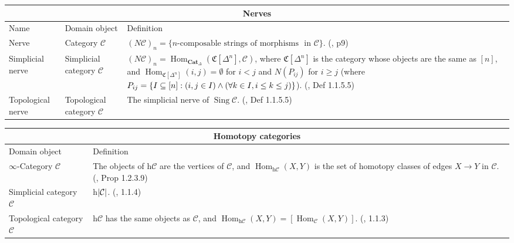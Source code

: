 \documentclass{article}
\DeclareMathOperator{\Hom}{Hom}
\DeclareMathOperator{\Sing}{Sing}
\def\subq{\ensuremath\subseteq}
\begin{document}
\begin{tabular}{ |p{3cm}||p{5cm}|p{7cm}|}
 \hline
 \multicolumn{3}{|c|}{Nerves}\\
 \hline
 Name& Domain object & Definition\\
  \hline\hline
  Nerve & Category \(\mathcal{C}\) & \((N\mathcal{C})_n=\text{\{}n\text{-composable strings of morphisms}\) \(\text{ in } \mathcal{C}\text{\}}\). (\autocite{htt}, p9) \\
 \hline
 Simplicial nerve & Simplicial category \(\mathcal{C}\) & \((N \mathcal{C})_n=\Hom_{\textbf{Cat}_\Delta}(\mathfrak{C}[\Delta^n], \mathcal{C})\), where \(\mathfrak{C}[\Delta^n]\) is the category whose objects are the same as \([n]\), and \(\Hom_{\mathfrak{C}[\Delta^n]}(i,j)=\emptyset\) for \(i<j\) and \(N(P_{ij})\) for \(i\geq j\) (where \(P_{ij}=\{I \subq [n] : (i, j \in I)\wedge (\forall k \in I, i \leq k \leq j)\}\)). (\autocite{htt}, Def 1.1.5.5)\\
 \hline
 Topological nerve & Topological category \(\mathcal{C}\) & The simplicial nerve of \(\Sing \mathcal{C}\). (\autocite{htt}, Def 1.1.5.5)\\
 \hline
\end{tabular}

\text{}

\text{}

\begin{tabular}{ |p{5cm}||p{8cm}|}
 \hline
 \multicolumn{2}{|c|}{Homotopy categories}\\
 \hline
 Domain object & Definition\\
  \hline\hline
  \(\infty\)-Category \(\mathcal{C}\) & The objects of h\(\mathcal{C}\) are the vertices of \(\mathcal{C}\), and \(\Hom_{\text{h}\mathcal{C}}(X,Y)\) is the set of homotopy classes of edges \(X\to Y\) in \(\mathcal{C}\). (\autocite{htt}, Prop 1.2.3.9)\\
  \hline
  Simplicial category \(\mathcal{C}\) & h\(\lvert\mathcal{C}\rvert\). (\autocite{htt}, 1.1.4) \\ 
 \hline
   Topological category \(\mathcal{C}\) & h\(\mathcal{C}\) has the same objects as \(\mathcal{C}\), and \(\Hom_{\text{h}\mathcal{C}}(X,Y)=[\Hom_\mathcal{C}(X,Y)]\). (\autocite{htt}, 1.1.3) \\
  \hline 
\end{tabular}

\text{}

\text{}
\end{document}
